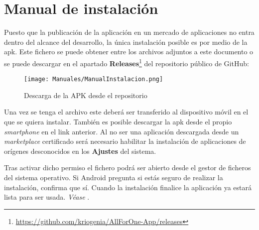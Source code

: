 \chapter{Manual de instalación}
\label{ch:manual_instalacion}

Puesto que la publicación de la aplicación en un mercado de aplicaciones no entra dentro del alcance del desarrollo, la única instalación posible es por medio de la \acrshort{apk}. Este fichero se puede obtener entre los archivos adjuntos a este documento o se puede descargar en el apartado \textbf{Releases}\footnote{\href{https://github.com/kriogenia/AllForOne-App/releases}{https://github.com/kriogenia/AllForOne-App/releases}} del repositorio público de GitHub: 

\begin{figure}[H]
    \centering
    \texttt{[image: Manuales/ManualInstalacion.png]}
    \caption{Descarga de la APK desde el repositorio}
    \label{man:instalacion}
\end{figure}

Una vez se tenga el archivo  este deberá ser transferido al dispositivo móvil en el que se quiera instalar. También es posible descargar la \acrshort{apk} desde el propio \emph{smartphone} en el link anterior. Al no ser una aplicación descargada desde un \emph{marketplace} certificado será necesario habilitar la instalación de aplicaciones de orígenes desconocidos en los \textbf{Ajustes} del sistema\cite{xatakaApk}.

Tras activar dicho permiso el fichero podrá ser abierto desde el gestor de ficheros del sistema operativo. Si Android pregunta si estás seguro de realizar la instalación, confirma que sí. Cuando la instalación finalice la aplicación ya estará lista para ser usada. \emph{Véase  }.